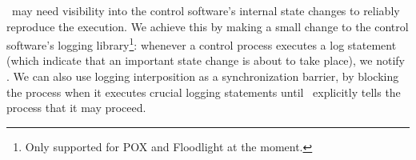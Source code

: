 \projectname~may need visibility into the control software's internal state
changes to reliably reproduce the execution. We achieve this by
making a
small change to the control software's logging library\footnote{Only supported
for POX and Floodlight at the moment.}: whenever a control process executes a log
statement (which indicate that an important state change is about to take
place), we notify \projectname. We can also use logging interposition as a
synchronization barrier, by blocking the process when it executes crucial logging statements
until \projectname~explicitly tells the process that it may proceed.

%
%
%
%
%
%

